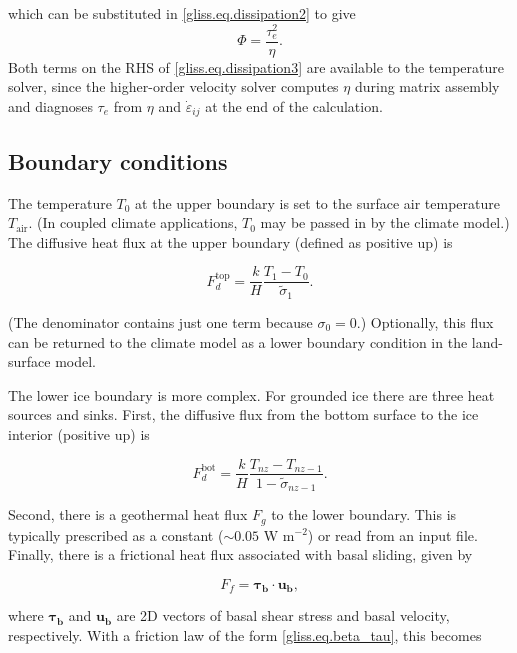 \noindent
which can be substituted in \eqref{gliss.eq.dissipation2} to give
\begin{equation}
  \label{gliss.eq.dissipation3}
  \Phi = \frac{\tau_e^2}{\eta}.
\end{equation}
%
Both terms on the RHS of \eqref{gliss.eq.dissipation3} are available to the temperature solver,
since the higher-order velocity solver computes $\eta$ during matrix assembly
and diagnoses $\tau_e$ from $\eta$ and $\dot{\varepsilon}_{ij}$ at the end of the calculation.

\subsection{Boundary conditions}
The temperature $T_0$ at the upper boundary is set to the surface air temperature $T_{\mathrm{air}}$.
(In coupled climate applications, $T_0$ may be passed in by the climate model.)
The diffusive heat flux at the upper boundary (defined as positive up) is

\begin{equation}
  F_d^{\mathrm{top}} = \frac{k}{H} \frac{T_1 - T_0}{\tilde{\sigma}_1}.
\end{equation}

\noindent
(The denominator contains just one term because $\sigma_0 = 0$.)
Optionally, this flux can be returned to the climate model as a lower boundary
condition in the land-surface model.

The lower ice boundary is more complex. For grounded ice there are three heat sources and sinks.
First, the diffusive flux from the bottom surface to the ice interior 
(positive up) is

\begin{equation}
  F_d^{\mathrm{bot}} = \frac{k}{H} \frac{T_{nz} - T_{nz-1}}{1 - \tilde{\sigma}_{nz-1}}.
\end{equation}

\noindent
Second, there is a geothermal heat flux $F_g$ to the lower boundary. This is typically 
prescribed as a constant ($\sim 0.05$ W m$^{-2}$) or read from an input file.
Finally, there is a frictional heat flux associated with basal sliding,
given by \citep[p. 418]{Cuffey2010}

\begin{equation}
  F_f = \mathbf{\tau_b} \cdot \mathbf{u_b},
\end{equation}

\noindent
where $\mathbf{\tau_b}$ and $\mathbf{u_b}$ are 2D vectors of basal shear stress and basal velocity,
respectively. With a friction law of the form \eqref{gliss.eq.beta_tau}, this becomes

